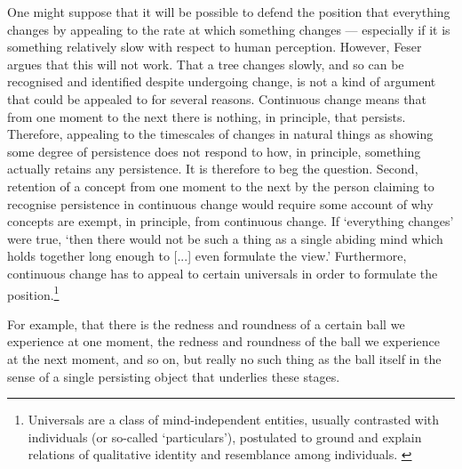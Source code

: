 One might suppose that it will be possible to defend the position that everything changes by appealing to the rate at which something changes --- especially if it is something relatively slow with respect to human perception. However, Feser argues that this will not work.
That a tree changes slowly, and so can be recognised and identified despite undergoing change, is not a kind of argument that could be appealed to for several reasons. Continuous change means that from one moment to the next there is nothing, in principle, that persists. Therefore, appealing to the timescales of changes in natural things as showing some degree of persistence does not respond to how, in principle, something actually retains any persistence. It is therefore to beg the question. Second, retention of a concept from one moment to the next by the person claiming to recognise persistence in continuous change would require some account of why concepts are exempt, in principle, from continuous change.
If `everything changes' were true, `then there would not be such a thing as a single abiding mind which holds together long enough to [...] even formulate the view.' \parencite[][18]{feser2019aristotle} Furthermore, continuous change has to appeal to certain {universals} in order to formulate the position.\footnote{Universals are a class of mind-independent entities, usually contrasted with individuals (or so-called `particulars'), postulated to ground and explain relations of qualitative identity and resemblance among individuals. \parencite[][]{iep-universals}}
\begin{quoting}
For example, that there is the redness and roundness of a certain ball we experience at one moment, the redness and roundness of the ball we experience at the next moment, and so on, but really no such thing as the ball itself in the sense of a single persisting object that underlies these stages. \parencite[][18]{feser2019aristotle}
\end{quoting}

